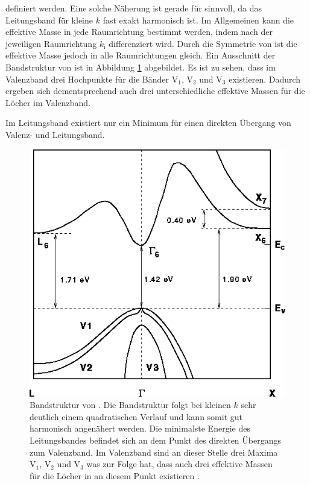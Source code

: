 definiert werden.
Eine solche Näherung ist gerade für  sinnvoll, da das Leitungsband für kleine $k$ fast exakt harmonisch ist.
Im Allgemeinen kann die effektive Masse in jede Raumrichtung bestimmt werden, indem nach der jeweiligen Raumrichtung $k_\text{i}$ differenziert wird.
Durch die Symmetrie von  ist die effektive Masse jedoch in alle Raumrichtungen gleich.
Ein Ausschnitt der Bandstruktur von  ist in Abbildung \ref{fig:Band_GaAs} abgebildet.
Es ist zu sehen, dass im Valenzband drei Hochpunkte für die Bänder V$_1$, V$_2$ und V$_3$ existieren.
Dadurch ergeben sich dementsprechend auch drei unterschiedliche effektive Massen für die Löcher im Valenzband.\par
Im Leitungsband existiert nur ein Minimum für einen direkten Übergang von Valenz- und Leitungsband.

\begin{figure}[H]
  \centering
  \includegraphics[width = .4\textwidth]{images/Bandstruktur_GaAs.png}
  \caption{Bandstruktur von . Die Bandstruktur folgt bei kleinen $k$ sehr deutlich einem quadratischen Verlauf und kann somit gut harmonisch angenähert werden. Die minimalste Energie des Leitungsbandes befindet sich an dem Punkt des direkten Übergangs zum Valenzband. Im Valenzband sind an dieser Stelle drei Maxima V$_1$, V$_2$ und V$_3$ was zur Folge hat, dass auch drei effektive Massen für die Löcher in  an diesem Punkt existieren \cite{Band_GaAs}.}
  \label{fig:Band_GaAs}
\end{figure}



